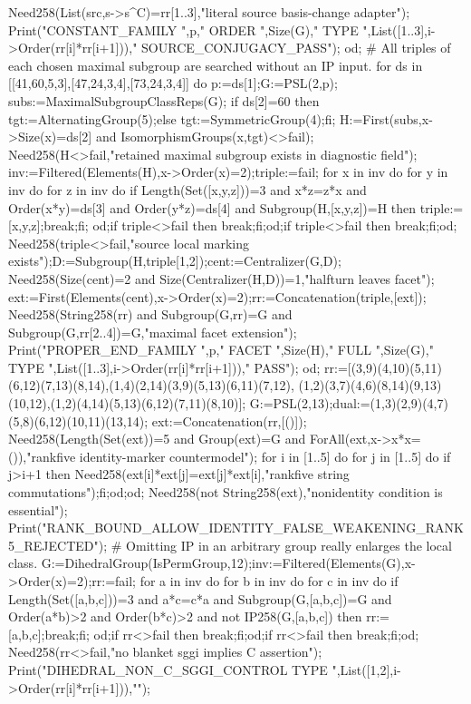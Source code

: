 \documentclass[11pt,a4paper]{article}
\begin{document}
\begin{CompleteProgram}
 Need258(List(src,s->s^C)=rr{[1..3]},"literal source basis-change adapter");
 Print("CONSTANT_FAMILY ",p," ORDER ",Size(G)," TYPE ",List([1..3],i->Order(rr[i]*rr[i+1]))," SOURCE_CONJUGACY_PASS\n");
 od;
 # All triples of each chosen maximal subgroup are searched without an IP input.
 for ds in [[41,60,5,3],[47,24,3,4],[73,24,3,4]] do
 p:=ds[1];G:=PSL(2,p);
 subs:=MaximalSubgroupClassReps(G);
 if ds[2]=60 then tgt:=AlternatingGroup(5);else tgt:=SymmetricGroup(4);fi;
 H:=First(subs,x->Size(x)=ds[2] and IsomorphismGroups(x,tgt)<>fail);
 Need258(H<>fail,"retained maximal subgroup exists in diagnostic field");
 inv:=Filtered(Elements(H),x->Order(x)=2);triple:=fail;
 for x in inv do for y in inv do for z in inv do
 if Length(Set([x,y,z]))=3 and x*z=z*x and Order(x*y)=ds[3] and Order(y*z)=ds[4] and Subgroup(H,[x,y,z])=H then triple:=[x,y,z];break;fi;
 od;if triple<>fail then break;fi;od;if triple<>fail then break;fi;od;
 Need258(triple<>fail,"source local marking exists");D:=Subgroup(H,triple{[1,2]});cent:=Centralizer(G,D);
 Need258(Size(cent)=2 and Size(Centralizer(H,D))=1,"halfturn leaves facet");
 ext:=First(Elements(cent),x->Order(x)=2);rr:=Concatenation(triple,[ext]);
 Need258(String258(rr) and Subgroup(G,rr)=G and Subgroup(G,rr{[2..4]})=G,"maximal facet extension");
 Print("PROPER_END_FAMILY ",p," FACET ",Size(H)," FULL ",Size(G)," TYPE ",List([1..3],i->Order(rr[i]*rr[i+1]))," PASS\n");
 od;
 rr:=[(3,9)(4,10)(5,11)(6,12)(7,13)(8,14),(1,4)(2,14)(3,9)(5,13)(6,11)(7,12),
 (1,2)(3,7)(4,6)(8,14)(9,13)(10,12),(1,2)(4,14)(5,13)(6,12)(7,11)(8,10)];
 G:=PSL(2,13);dual:=(1,3)(2,9)(4,7)(5,8)(6,12)(10,11)(13,14);
 ext:=Concatenation(rr,[()]);
 Need258(Length(Set(ext))=5 and Group(ext)=G and ForAll(ext,x->x*x=()),"rankfive identity-marker countermodel");
 for i in [1..5] do for j in [1..5] do if j>i+1 then
 Need258(ext[i]*ext[j]=ext[j]*ext[i],"rankfive string commutations");fi;od;od;
 Need258(not String258(ext),"nonidentity condition is essential");
 Print("RANK_BOUND_ALLOW_IDENTITY_FALSE_WEAKENING_RANK5_REJECTED\n");
 # Omitting IP in an arbitrary group really enlarges the local class.
 G:=DihedralGroup(IsPermGroup,12);inv:=Filtered(Elements(G),x->Order(x)=2);rr:=fail;
 for a in inv do for b in inv do for c in inv do
 if Length(Set([a,b,c]))=3 and a*c=c*a and Subgroup(G,[a,b,c])=G
 and Order(a*b)>2 and Order(b*c)>2 and not IP258(G,[a,b,c]) then rr:=[a,b,c];break;fi;
 od;if rr<>fail then break;fi;od;if rr<>fail then break;fi;od;
 Need258(rr<>fail,"no blanket sggi implies C assertion");
 Print("DIHEDRAL_NON_C_SGGI_CONTROL TYPE ",List([1,2],i->Order(rr[i]*rr[i+1])),"\n");

\end{CompleteProgram}
\end{document}
